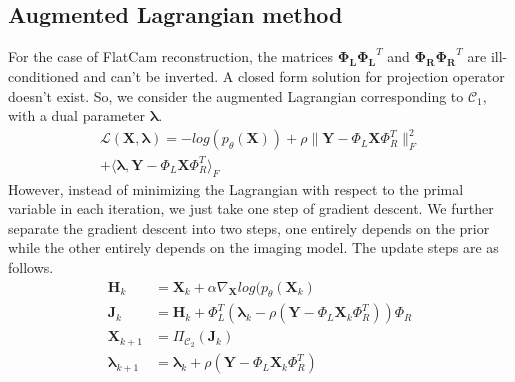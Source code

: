 \documentclass[journal,twoside]{IEEEtran}
\newcommand{\X}{\mathbf{X}}
\newcommand{\Y}{\mathbf{Y}}
\begin{document}
\subsection{Augmented Lagrangian method}
\label{sec:augmented_lag}
For the case of FlatCam reconstruction, the matrices $\mathbf{\Phi_L}\mathbf{\Phi_L}^T$ and $\mathbf{\Phi_R}\mathbf{\Phi_R}^T$ are ill-conditioned and can't be inverted. A closed form solution for projection operator doesn't exist. So, we consider the augmented Lagrangian corresponding to $\mathcal{C}_1$, with a dual parameter $\mathbf{\lambda}$.
\begin{multline}
\mathcal{L}(\X,\bm{\lambda}) = -log(p_{\theta}(\X)) + \rho\|\Y - \Phi_L \X \Phi_R^T \|^2_F \\ + \langle \bm{\lambda}, \Y - \Phi_L \X \Phi_R^T  \rangle_F
\end{multline}
However, instead of minimizing the Lagrangian with respect to the primal variable in each iteration, we just take one step of gradient descent. We further separate the gradient descent into two steps, one entirely depends on the prior while the other entirely depends on the imaging model. The update steps are as follows.
\begin{align}
    \mathbf{H}_k &= \X_k + \alpha \nabla_{\X}{log(p_{\theta}(\X_k)} \\
    \label{eq:proj_flatcam}
    \mathbf{J}_k &= \mathbf{H}_k + \Phi_L^T (\bm{\lambda}_k -  \rho(\Y - \Phi_L \X_k \Phi_R^T)) \Phi_R \\
    \X_{k+1} &= \Pi_{\mathcal{C}_2}(\mathbf{J}_{k}) \\
    \label{eq:dual_v}
    \bm{\lambda}_{k+1} &= \bm{\lambda}_k + \rho(\Y - \Phi_L \X_k \Phi_R^T )
\end{align}
\end{document}
